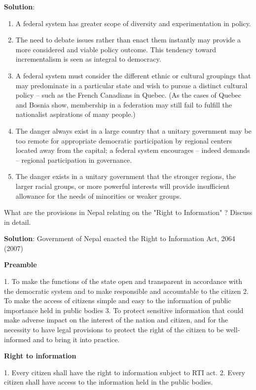\documentclass[
  openany]{book}
\newcommand{\question}{\item}
\newenvironment{solution}{ {\bfseries Solution}:}{}
\begin{document}
\begin{questions}
\begin{solution}
\begin{enumerate}
\item A federal system has greater scope of diversity and experimentation in policy.
\item The need to debate issues rather than enact them instantly may provide a more considered and viable policy outcome. This tendency toward incrementalism is seen as integral to democracy.
\item A federal system must consider the different ethnic or cultural groupings that may predominate in a particular state and wish to pursue a distinct cultural policy -- such as the French Canadians in Quebec. (As the cases of Quebec and Bosnia show, membership in a federation may still fail to fulfill the nationalist aspirations of many people.)
\item The danger always exist in a large country that a unitary government may be too remote for appropriate democratic participation by regional centers located away from the capital; a federal system encourages -- indeed demands -- regional participation in governance.
\item The danger exists in a unitary government that the stronger regions, the larger racial groups, or more powerful interests will provide insufficient allowance for the needs of minorities or weaker groups.
\end{enumerate}
\end{solution}

\question What are the provisions in Nepal relating on the "Right to Information" ? Discuss in detail.

\begin{solution}
Government of Nepal enacted the Right to Information Act, 2064 (2007)

\textbf{Preamble}

1. To make the functions of the state open and transparent in accordance with the democratic system and to make responsible and accountable to the citizen
2. To make the access of citizens simple and easy to the information of public importance held in public bodies
3. To protect sensitive information that could make adverse impact on the interest of the nation and citizen, and for the necessity to have legal provisions to protect the right of the citizen to be well-informed and to bring it into practice.

\textbf{Right to information}

1. Every citizen shall have the right to information subject to RTI act.
2. Every citizen shall have access to the information held in the public bodies.


\end{solution}
\end{questions}
\end{document}
